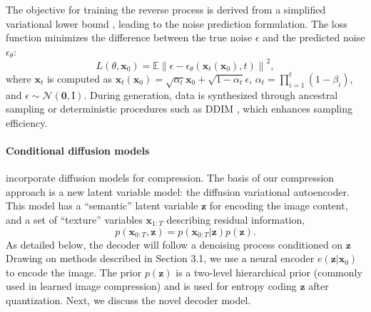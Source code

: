 The objective for training the reverse process is derived from a simplified variational lower bound \cite{Ho2020}, leading to the noise prediction formulation. The loss function minimizes the difference between the true noise $\epsilon$ and the predicted noise $\epsilon_\theta$:
\begin{equation}
    L\left(\theta,\boldsymbol{x}_0\right)=\mathbb{E}\left\|\epsilon-\epsilon_\theta\left(\boldsymbol{x}_t\left(\boldsymbol{x}_0\right),t\right)\right\|^2,
\end{equation}
where $\boldsymbol{x}_t$ is computed as $\boldsymbol{x}_t\left(\boldsymbol{x}_0\right)=\sqrt{\alpha_t}\boldsymbol{x}_0+\sqrt{1-\alpha_t}\epsilon$, $\alpha_t=\prod_{i=1}^t\left(1-\beta_i\right)$, and $\epsilon\sim \mathcal{N}\left(\boldsymbol{0},\boldsymbol{\mathrm{I}}\right)$. During generation, data is synthesized through ancestral sampling or deterministic procedures such as DDIM \cite{Song2021}, which enhances sampling efficiency.

\paragraph{\textbf{Conditional diffusion models}} incorporate diffusion models for compression. The basis of our compression approach is a new latent variable model: the diffusion variational autoencoder. This model has a ``semantic'' latent variable $\boldsymbol{z}$ for encoding the image content, and a set of ``texture'' variables $\boldsymbol{x}_{1:T}$ describing residual information,
\begin{equation}
    p\left(\boldsymbol{x}_{0:T},\boldsymbol{z}\right)=p\left(\boldsymbol{x}_{0:T}|\boldsymbol{z}\right)p\left(\boldsymbol{z}\right).
\end{equation}
As detailed below, the decoder will follow a denoising process conditioned on $\boldsymbol{z}$ Drawing on methods
 described in Section 3.1, we use a neural encoder $e\left(\boldsymbol{z}|\boldsymbol{x}_{0}\right)$ to encode the image. The prior $p\left(\boldsymbol{z}\right)$  is a
 two-level hierarchical prior (commonly used in learned image compression) and is used for entropy coding $\boldsymbol{z}$ after quantization. Next, we discuss the novel decoder model.

